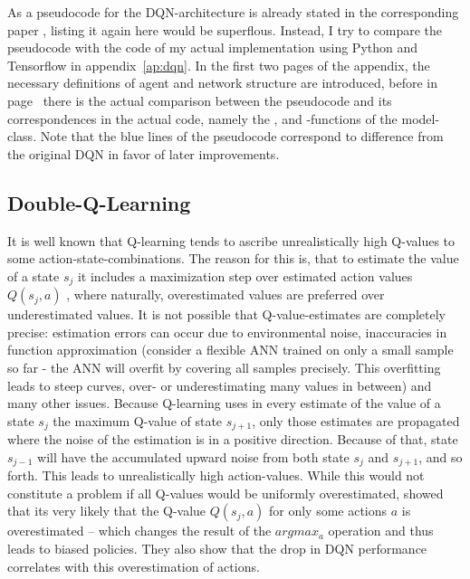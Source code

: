 As a pseudocode for the DQN-architecture is already stated in the corresponding paper \cite{mnih_human-level_2015}, listing it again here would be superflous. Instead, I try to compare the pseudocode with the code of my actual implementation using Python and Tensorflow in appendix~\ref{ap:dqn}. In the first two pages of the appendix, the necessary definitions of agent and network structure are introduced, before in page~\pageref{ap:dqn_comparison} there is the actual comparison between the pseudocode and its correspondences in the actual code, namely the ,  and -functions of the model-class. Note that the blue lines of the pseudocode correspond to difference from the original DQN in favor of later improvements.

\subsection{Double-Q-Learning}
It is well known that Q-learning tends to ascribe unrealistically high Q-values to some action-state-combinations. The reason for this is, that to estimate the value of a state $s_j$ it includes a maximization step over estimated action values $Q(s_j,a)$ , where naturally, overestimated values are preferred over underestimated values. 
It is not possible that Q-value-estimates are completely precise: estimation errors can occur due to environmental noise, inaccuracies in function approximation (consider a flexible ANN trained on only a small sample so far - the ANN will overfit by covering all samples precisely. This overfitting leads to steep curves, over- or underestimating many values in between) and many other issues. Because Q-learning uses in every estimate of the value of a state $s_j$ the maximum Q-value of state $s_{j+1}$, only those estimates are propagated where the noise of the estimation is in a positive direction. Because of that, state $s_{j-1}$ will have the accumulated upward noise from both state $s_j$ and $s_{j+1}$, and so forth. This leads to unrealistically high action-values. While this would not constitute a problem if all Q-values would be uniformly overestimated, \cite{van_hasselt_deep_2015} showed that its very likely that the Q-value $Q(s_j,a)$ for only some actions $a$ is overestimated -- which changes the result of the $argmax_a$ operation and thus leads to biased policies. They also show that the drop in DQN performance correlates with this overestimation of actions.\\

